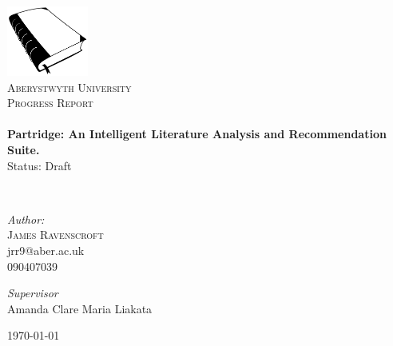 \begin{titlepage}
 
\begin{center}
 
\includegraphics[width=0.20\textwidth]{../cover_logo.png}\\[1cm]
 
\textsc{\LARGE Aberystwyth University}\\[1.5cm]
 
\textsc{\LARGE Progress Report}\\[0.5cm]
 
 
\HRule \\[0.4cm]
{ \huge \bfseries Partridge: An Intelligent Literature Analysis and
Recommendation Suite.}\\[0.4cm]

Status: Draft
 
\HRule \\[1.5cm]

\begin{minipage}{0.4\textwidth}
\begin{flushleft} \large
\emph{Author:}\\
\textsc{James Ravenscroft}\\
jrr9@aber.ac.uk\\
090407039 
\end{flushleft}
\end{minipage}
\begin{minipage}{0.4\textwidth}
\begin{flushright} \large
\emph{Supervisor} \\
Amanda Clare
Maria Liakata

\end{flushright}
\end{minipage}

\vfill
 
{\large \today}
 
\end{center}
 
\end{titlepage}

